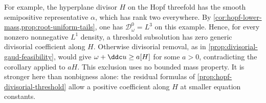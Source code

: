 For example, the hyperplane divisor $H$ on the Hopf threefold has the smooth semipositive representative $\alpha$, which has rank two everywhere. By \cref{cor:hopf-lower-mass,prop:root-uniform-tails}, one has $\mathcal D_\omega^0=L^3$ on this example. Hence, for every nonzero nonnegative $L^1$ density, a threshold subsolution has zero generic divisorial coefficient along $H$. Otherwise divisorial removal, as in \cref{prop:divisorial-gaud-feasibility}, would give $\omega+\ddc u\geq a[H]$ for some $a>0$, contradicting the corollary applied to $aH$. This exclusion uses no bounded mass property. It is stronger here than nonbigness alone: the residual formulas of \cref{prop:hopf-divisorial-threshold} allow a positive coefficient along $H$ at smaller equation constants.
